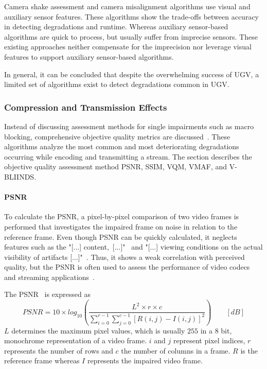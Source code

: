 Camera shake assessment and camera misalignment algorithms use visual and auxiliary sensor features.
These algorithms show the trade-offs between accuracy in detecting degradations and runtime.
Whereas auxiliary sensor-based algorithms are quick to process, but usually suffer from imprecise sensors.
These existing approaches neither compensate for the imprecision nor leverage visual features to support auxiliary sensor-based algorithms.

In general, it can be concluded that despite the overwhelming success of \ac{UGV}, a limited set of algorithms exist to detect degradations common in \ac{UGV}. 
\subsubsection{Compression and Transmission Effects}
\label{sec:210_qualitymetrics}
Instead of discussing assessment methods for single impairments such as macro blocking, comprehensive objective quality metrics are discussed~\cite{Wang2002}.
These algorithms analyze the most common and most deteriorating degradations occurring while encoding and transmitting a stream.
The section describes the objective quality assessment method \ac{PSNR}, \ac{SSIM}, \ac{VQM}, \ac{VMAF}, and \ac{V-BLIINDS}. 
\paragraph{PSNR}
To calculate the \ac{PSNR}, a pixel-by-pixel comparison of two video frames is performed that investigates the impaired frame on noise in relation to the reference frame.
Even though \ac{PSNR} can be quickly calculated, it neglects features such as the "[...] content,~[...]"~\cite[2]{Winkler2005} and "[...] viewing conditions on the actual visibility of artifacts [...]"~\cite[202]{Winkler2001}.
Thus, it shows a weak correlation with perceived quality, but the \ac{PSNR} is often used to assess the performance of video codecs and streaming applications~\cite{Suarez2016,Winkler2008}. 

The \ac{PSNR}~\cite[472]{Stathaki2011} is expressed as
\begin{equation}
PSNR = 10 \times log_{10}(\frac{L^2 \times r \times c}{\sum_{i=0}^{r-1}\sum_{j=0}^{c-1}[R(i,j)-I(i,j)]^2})	\qquad[\unit{dB}]
\end{equation}
$L$ determines the maximum pixel values, which is usually $255$ in a $8$ bit, monochrome representation of a video frame.
$i$ and $j$ represent pixel indices, $r$ represents the number of rows and $c$ the number of columns in a frame.
$R$ is the reference frame whereas $I$ represents the impaired video frame.
